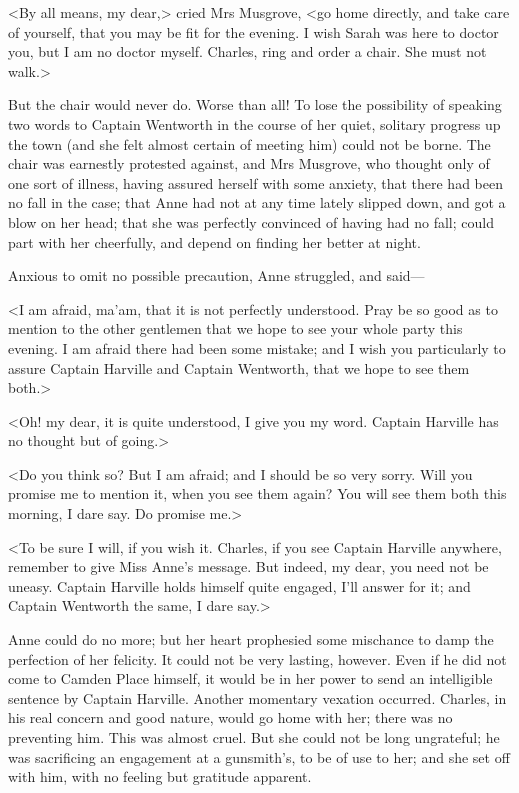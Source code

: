 <By all means, my dear,> cried Mrs Musgrove, <go home directly, and take care of yourself, that you may be fit for the evening. I wish Sarah was here to doctor you, but I am no doctor myself. Charles, ring and order a chair. She must not walk.>

But the chair would never do. Worse than all! To lose the possibility of speaking two words to Captain Wentworth in the course of her quiet, solitary progress up the town (and she felt almost certain of meeting him) could not be borne. The chair was earnestly protested against, and Mrs Musgrove, who thought only of one sort of illness, having assured herself with some anxiety, that there had been no fall in the case; that Anne had not at any time lately slipped down, and got a blow on her head; that she was perfectly convinced of having had no fall; could part with her cheerfully, and depend on finding her better at night.

Anxious to omit no possible precaution, Anne struggled, and said—

<I am afraid, ma'am, that it is not perfectly understood. Pray be so good as to mention to the other gentlemen that we hope to see your whole party this evening. I am afraid there had been some mistake; and I wish you particularly to assure Captain Harville and Captain Wentworth, that we hope to see them both.>

<Oh! my dear, it is quite understood, I give you my word. Captain Harville has no thought but of going.>

<Do you think so? But I am afraid; and I should be so very sorry. Will you promise me to mention it, when you see them again? You will see them both this morning, I dare say. Do promise me.>

<To be sure I will, if you wish it. Charles, if you see Captain Harville anywhere, remember to give Miss Anne's message. But indeed, my dear, you need not be uneasy. Captain Harville holds himself quite engaged, I'll answer for it; and Captain Wentworth the same, I dare say.>

Anne could do no more; but her heart prophesied some mischance to damp the perfection of her felicity. It could not be very lasting, however. Even if he did not come to Camden Place himself, it would be in her power to send an intelligible sentence by Captain Harville. Another momentary vexation occurred. Charles, in his real concern and good nature, would go home with her; there was no preventing him. This was almost cruel. But she could not be long ungrateful; he was sacrificing an engagement at a gunsmith's, to be of use to her; and she set off with him, with no feeling but gratitude apparent.


